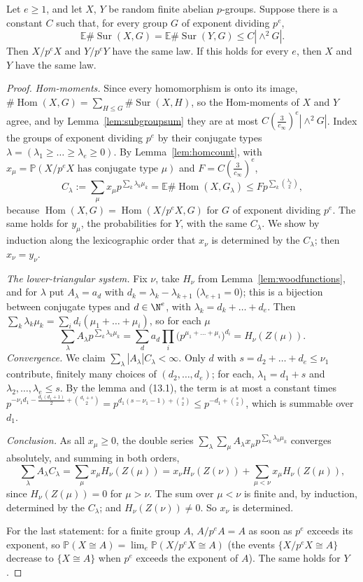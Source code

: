 \begin{theorem}[Wood, 2017]\label{thm:woodunique}
Let $e\ge1$, and let $X$, $Y$ be random finite abelian $p$-groups. Suppose there is a constant $C$ such that, for every group $G$ of exponent dividing $p^e$,
\[
\mathbb E\#\operatorname{Sur}(X,G)=\mathbb E\#\operatorname{Sur}(Y,G)\le C|\wedge^2G|.
\]
Then $X/p^eX$ and $Y/p^eY$ have the same law. If this holds for every $e$, then $X$ and $Y$ have the same law.
\end{theorem}
\begin{proof}
\emph{Hom-moments.} Since every homomorphism is onto its image, $\#\operatorname{Hom}(X,G)=\sum_{H\le G}\#\operatorname{Sur}(X,H)$, so the Hom-moments of $X$ and $Y$ agree, and by Lemma~\ref{lem:subgroupsum} they are at most $C(\frac3{c_\infty})^e|\wedge^2G|$. Index the groups of exponent dividing $p^e$ by their conjugate types $\lambda=(\lambda_1\ge\dots\ge\lambda_e\ge0)$. By Lemma~\ref{lem:homcount}, with $x_\mu=\mathbb P(X/p^eX\text{ has conjugate type }\mu)$ and $F=C(\frac3{c_\infty})^e$,
\[
C_\lambda:=\sum_\mu x_\mu p^{\sum_k\lambda_k\mu_k}=\mathbb E\#\operatorname{Hom}(X,G_\lambda)\le Fp^{\sum_k\binom{\lambda_k}2},\tag{13.1}
\]
because $\operatorname{Hom}(X,G)=\operatorname{Hom}(X/p^eX,G)$ for $G$ of exponent dividing $p^e$. The same holds for $y_\mu$, the probabilities for $Y$, with the same $C_\lambda$. We show by induction along the lexicographic order that $x_\nu$ is determined by the $C_\lambda$; then $x_\nu=y_\nu$.

\emph{The lower-triangular system.} Fix $\nu$, take $H_\nu$ from Lemma~\ref{lem:woodfunctions}, and for $\lambda$ put $A_\lambda=a_d$ with $d_k=\lambda_k-\lambda_{k+1}$ ($\lambda_{e+1}=0$); this is a bijection between conjugate types and $d\in\N^e$, with $\lambda_k=d_k+\dots+d_e$. Then $\sum_k\lambda_k\mu_k=\sum_id_i(\mu_1+\dots+\mu_i)$, so for each $\mu$
\[
\sum_\lambda A_\lambda p^{\sum_k\lambda_k\mu_k}=\sum_da_d\prod_i\bigl(p^{\mu_1+\dots+\mu_i}\bigr)^{d_i}=H_\nu(Z(\mu)).
\]
\emph{Convergence.} We claim $\sum_\lambda|A_\lambda|C_\lambda<\infty$. Only $d$ with $s=d_2+\dots+d_e\le\nu_1$ contribute, finitely many choices of $(d_2,\dots,d_e)$; for each, $\lambda_1=d_1+s$ and $\lambda_2,\dots,\lambda_e\le s$. By the lemma and (13.1), the term is at most a constant times $p^{-\nu_1d_1-\frac{d_1(d_1+1)}2+\binom{d_1+s}2}=p^{d_1(s-\nu_1-1)+\binom s2}\le p^{-d_1+\binom s2}$, which is summable over $d_1$.

\emph{Conclusion.} As all $x_\mu\ge0$, the double series $\sum_\lambda\sum_\mu A_\lambda x_\mu p^{\sum_k\lambda_k\mu_k}$ converges absolutely, and summing in both orders,
\[
\sum_\lambda A_\lambda C_\lambda=\sum_\mu x_\mu H_\nu(Z(\mu))=x_\nu H_\nu(Z(\nu))+\sum_{\mu<\nu}x_\mu H_\nu(Z(\mu)),
\]
since $H_\nu(Z(\mu))=0$ for $\mu>\nu$. The sum over $\mu<\nu$ is finite and, by induction, determined by the $C_\lambda$; and $H_\nu(Z(\nu))\ne0$. So $x_\nu$ is determined.

For the last statement: for a finite group $A$, $A/p^eA=A$ as soon as $p^e$ exceeds its exponent, so $\mathbb P(X\cong A)=\lim_e\mathbb P(X/p^eX\cong A)$ (the events $\{X/p^eX\cong A\}$ decrease to $\{X\cong A\}$ when $p^e$ exceeds the exponent of $A$). The same holds for $Y$.
\end{proof}

